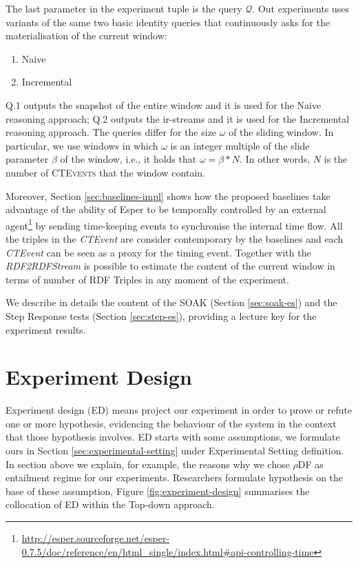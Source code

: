 The last parameter in the experiment tuple is the query $\mathcal{Q}$. Out  experiments uses variants of the same two basic identity queries that continuously asks for the materialisation of the current window:
\begin{enumerate}
\item[Q.1] Naive
\item[Q.2] Incremental
\end{enumerate}
 		 
Q.1 outputs the snapshot of the entire window and it is used for the Naive reasoning approach; Q.2 outputs the ir-streams and it is used for the Incremental reasoning approach. The queries differ for the size $\omega$ of the sliding window. In particular, we use windows in which $\omega$ is an integer multiple of the slide parameter $\beta$ of the window, i.e., it holds that $\omega = \beta * N$. In other words, $N$ is the number of \textsc{CTEvents} that the window contain. 

Moreover, Section \ref{sec:baselines-impl} shows how the proposed baselines take advantage of the ability of Esper to be temporally controlled by an external agent\footnote{\url{http://esper.sourceforge.net/esper-0.7.5/doc/reference/en/html_single/index.html#api-controlling-time}} by sending time-keeping events to synchronise the internal time flow. All the triples in the \textit{CTEvent} are consider contemporary by the baselines and each \textit{CTEvent} can be seen as a proxy for the timing event. Together with the \textit{RDF2RDFStream} is possible to estimate the content of the current window in terms of number of RDF Triples in any moment of the experiment.

We describe in details the content of the SOAK (Section \ref{sec:soak-es}) and the Step Response tests (Section \ref{sec:step-es}), providing a lecture key for the experiment results.

\section{Experiment Design}

Experiment design (ED) means project our experiment in order to prove or refute one or more hypothesis, evidencing the behaviour of the system in the context that those hypothesis involves. ED starts with some assumptions, we formulate ours in Section \ref{sec:experimental-setting} under Experimental Setting definition. In section above we explain, for example, the reasons why we chose $\rho$DF as entailment regime for our experiments. Researchers formulate hypothesis on the base of these assumption, Figure \ref{fig:experiment-design} summarises the collocation of ED within the Top-down approach.

